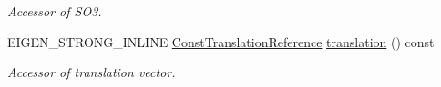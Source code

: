 \begin{DoxyCompactItemize}
\begin{DoxyCompactList}\small\item\em Accessor of S\+O3. \end{DoxyCompactList}\item 
E\+I\+G\+E\+N\+\_\+\+S\+T\+R\+O\+N\+G\+\_\+\+I\+N\+L\+I\+NE \hyperlink{class_eigen_1_1_map_3_01const_01_sophus_1_1_s_e3_group_3_01___scalar_01_4_00_01___options_01_4_a30dee589eb6520b39aaeabefb7685a98}{Const\+Translation\+Reference} \hyperlink{class_eigen_1_1_map_3_01const_01_sophus_1_1_s_e3_group_3_01___scalar_01_4_00_01___options_01_4_afb907b6cd2c8119952bb7f58a7f7b189}{translation} () const \hypertarget{class_eigen_1_1_map_3_01const_01_sophus_1_1_s_e3_group_3_01___scalar_01_4_00_01___options_01_4_afb907b6cd2c8119952bb7f58a7f7b189}{}\label{class_eigen_1_1_map_3_01const_01_sophus_1_1_s_e3_group_3_01___scalar_01_4_00_01___options_01_4_afb907b6cd2c8119952bb7f58a7f7b189}

\begin{DoxyCompactList}\small\item\em Accessor of translation vector. \end{DoxyCompactList}\end{DoxyCompactItemize}
